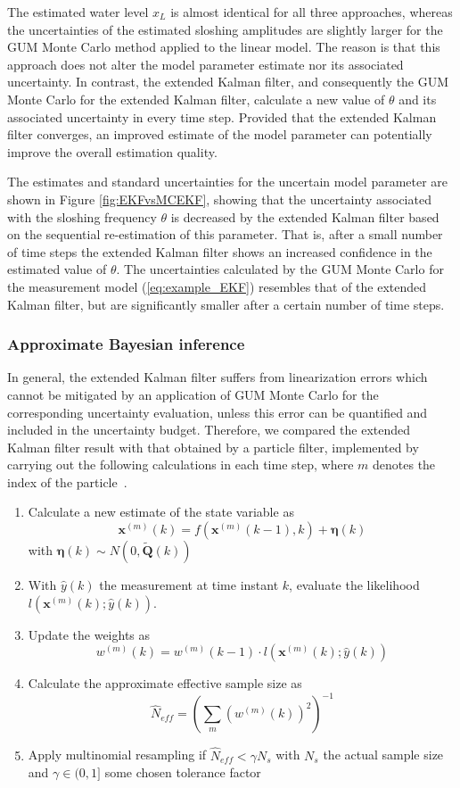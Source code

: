\documentclass[10pt]{article}
\begin{document}
\begin{spacing}{1}
The estimated water level $x_L$ is almost identical for all three approaches, whereas the uncertainties of the estimated sloshing amplitudes are slightly larger for the GUM Monte Carlo method applied to the linear model. The reason is that this approach does not alter the model parameter estimate nor its associated uncertainty. In contrast, the extended Kalman filter, and consequently the GUM Monte Carlo for the extended Kalman filter, calculate a new value of $\theta$ and its associated uncertainty in every time step. Provided that the extended Kalman filter converges, an improved estimate of the model parameter can potentially improve the overall estimation quality.

The estimates and standard uncertainties for the uncertain model parameter are shown in Figure \ref{fig:EKFvsMCEKF}, showing that the uncertainty associated with the sloshing frequency $\theta$ is decreased by the extended Kalman filter based on the sequential re-estimation of this parameter. That is, after a small number of time steps the extended Kalman filter shows an increased confidence in the estimated value of $\theta$. The uncertainties calculated by the GUM Monte Carlo for the measurement model (\ref{eq:example_EKF}) resembles that of the extended Kalman filter, but are significantly smaller after a certain number of time steps.



\subsubsection*{Approximate Bayesian inference}
In general, the extended Kalman filter suffers from linearization errors which cannot be mitigated by an application of GUM Monte Carlo for the corresponding uncertainty evaluation, unless this error can be quantified and included in the uncertainty budget. Therefore, we compared the extended Kalman filter result with that obtained by a particle filter, implemented by carrying out the following calculations in each time step, where $m$ denotes the index of the particle~\cite{Arulampalam:2002hg}.
\begin{enumerate}
 \item Calculate a new estimate of the state variable as \[\bm{x}^{(m)}(k) = f(\bm{x}^{(m)}(k-1),k) + \bm{\eta}(k) \] with $\bm{\eta}(k)\sim N(0,\tilde{\bm{Q}}(k))$
 \item With $\hat{y}(k)$ the measurement at time instant $k$, evaluate the likelihood $l(\bm{x}^{(m)}(k);\hat{y}(k))$.
\item Update the weights as \[w^{(m)}(k) = w^{(m)}(k-1)\cdot l(\bm{x}^{(m)}(k) ; \hat{y}(k))\]
 \item Calculate the approximate effective sample size as \[\hat{N}_{eff} = \left( \sum_{m} (w^{(m)}(k))^2 \right)^{-1} \]
 \item Apply multinomial resampling if $\hat{N}_{eff} < \gamma N_s$ with $N_s$ the actual sample size and $\gamma\in (0,1]$ some chosen tolerance factor
\end{enumerate} 


\end{spacing}
\end{document}
